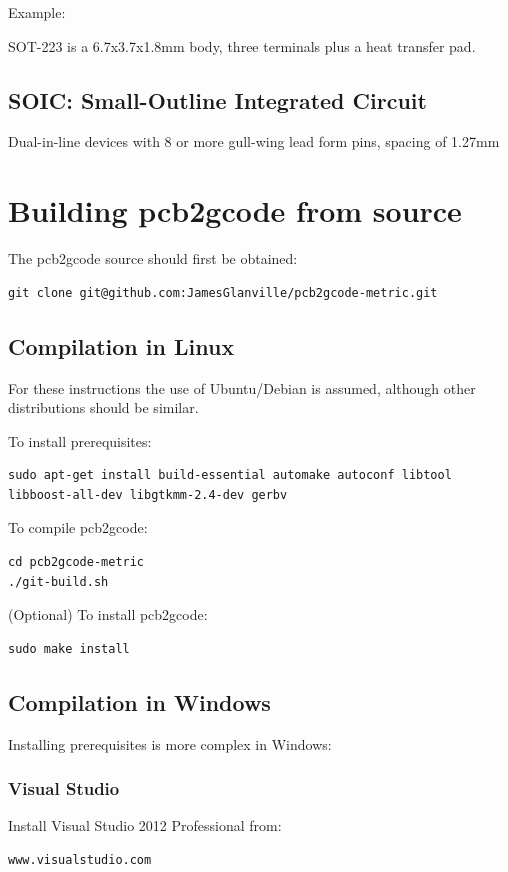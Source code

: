 \documentclass[a4paper,11pt]{article}  %
\begin{document}
Example:

SOT-223 is a 6.7x3.7x1.8mm body, three terminals plus a heat transfer pad.

\subsection{SOIC: Small-Outline Integrated Circuit}
Dual-in-line devices with 8 or more gull-wing lead form pins, spacing of 1.27mm

\newpage
\section{Building pcb2gcode from source}

The pcb2gcode source should first be obtained:
\begin{lstlisting}[frame=single]
git clone git@github.com:JamesGlanville/pcb2gcode-metric.git
\end{lstlisting}

\subsection{Compilation in Linux}
For these instructions the use of Ubuntu/Debian is assumed, although other distributions should be similar.

To install prerequisites:
\begin{lstlisting}[frame=single,breaklines=true]
sudo apt-get install build-essential automake autoconf libtool libboost-all-dev libgtkmm-2.4-dev gerbv
\end{lstlisting}

To compile pcb2gcode:
\begin{lstlisting}[frame=single]
cd pcb2gcode-metric
./git-build.sh
\end{lstlisting}

(Optional) To install pcb2gcode:
\begin{lstlisting}[frame=single]
sudo make install
\end{lstlisting}

\subsection{Compilation in Windows}
Installing prerequisites is more complex in Windows:

\subsubsection{Visual Studio}
Install Visual Studio 2012 Professional from:
\begin{lstlisting}[frame=single]
www.visualstudio.com
\end{lstlisting}
\end{document}
